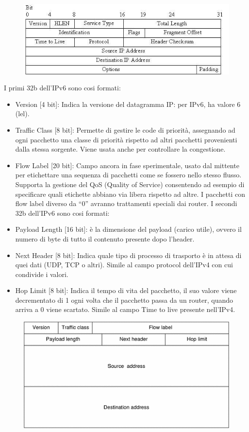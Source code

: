 \begin{figure}[H]
\centering
\includegraphics[scale=0.7]{res/img/46_IPv4.png}
\end{figure}

I primi 32b dell’IPv6 sono cosi formati:
\begin{itemize}
\item	Version [4 bit]: Indica la versione del datagramma IP: per IPv6, ha valore 6 (lel).
\item	Traffic Class [8 bit]: Permette di gestire le code di priorità, assegnando ad ogni pacchetto una classe di priorità rispetto ad altri pacchetti provenienti dalla stessa sorgente. Viene usata anche per controllare la congestione.
\item	Flow Label [20 bit]: Campo ancora in fase sperimentale, usato dal mittente per etichettare una sequenza di pacchetti come se fossero nello stesso flusso. Supporta la gestione del QoS (Quality of Service) consentendo ad esempio di specificare quali etichette abbiano via libera rispetto ad altre. I pacchetti con flow label diverso da “0” avranno trattamenti speciali dai router.
I secondi 32b dell’IPv6 sono cosi formati:
\item	Payload Length [16 bit]: è la dimensione del payload (carico utile), ovvero il numero di byte di tutto il contenuto presente dopo l’header.
\item	Next Header [8 bit]: Indica quale tipo di processo di trasporto è in attesa di quei dati (UDP, TCP o altri). Simile al campo protocol dell’IPv4 con cui condivide i valori.
\item	Hop Limit [8 bit]: Indica il tempo di vita del pacchetto, il suo valore viene decrementato di 1 ogni volta che il pacchetto passa da un router, quando arriva a 0 viene scartato. Simile al campo Time to live presente nell’IPv4.
\end{itemize}

\begin{figure}[H]
\centering
\includegraphics[scale=0.7]{res/img/46_IPv6.png}
\end{figure}

